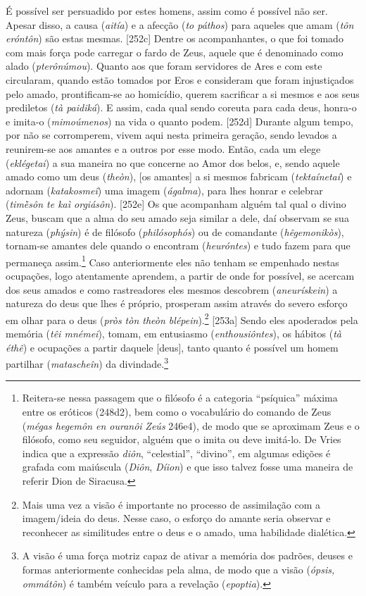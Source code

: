 É possível ser persuadido por estes homens, assim como é possível não
ser. Apesar disso, a causa (\emph{aitía}) e a afecção (\emph{to páthos})
para aqueles que amam (\emph{tôn eróntôn}) são estas mesmas. {[}252c{]}
Dentre os acompanhantes, o que foi tomado com mais força pode carregar o
fardo de Zeus, aquele que é denominado como alado (\emph{pterônúmou}).
Quanto aos que foram servidores de Ares e com este circularam, quando
estão tomados por Eros e consideram que foram injustiçados pelo amado,
prontificam-se ao homicídio, querem sacrificar a si mesmos e aos seus
prediletos (\emph{tà paidiká}). E assim, cada qual sendo coreuta para
cada deus, honra-o e imita-o (\emph{mimoúmenos}) na vida o quanto podem.
{[}252d{]} Durante algum tempo, por não se corromperem, vivem aqui nesta
primeira geração, sendo levados a reunirem-se aos amantes e a outros por
esse modo. Então, cada um elege (\emph{eklégetai}) a sua maneira no que
concerne ao Amor dos belos, e, sendo aquele amado como um deus
(\emph{theòn}), {[}os amantes{]} a si mesmos fabricam
(\emph{tektaínetaí}) e adornam (\emph{katakosmeî}) uma imagem
(\emph{ágalma}), para lhes honrar e celebrar (\emph{timḕsôn te kaì
orgiásôn}). {[}252e{]} Os que acompanham alguém tal qual o divino Zeus,
buscam que a alma do seu amado seja similar a dele, daí observam se sua
natureza (\emph{phýsin}) é de filósofo (\emph{philósophós}) ou de
comandante (\emph{hêgemonikòs}), tornam-se amantes dele quando o
encontram (\emph{heuróntes}) e tudo fazem para que permaneça
assim.\footnote{Reitera-se nessa passagem que o filósofo é a categoria
  ``psíquica'' máxima entre os eróticos (248d2), bem como o vocabulário
  do comando de Zeus (\emph{mégas hegemôn en ouranôi} \emph{Zeús}
  246e4), de modo que se aproximam Zeus e o filósofo, como seu seguidor,
  alguém que o imita ou deve imitá-lo. De Vries indica que a expressão
  \emph{diôn}, ``celestial'', ``divino'', em algumas edições é grafada
  com maiúscula (\emph{Diôn}, \emph{Díion}) e que isso talvez fosse uma
  maneira de referir Dion de Siracusa.} Caso anteriormente eles não
tenham se empenhado nestas ocupações, logo atentamente aprendem, a
partir de onde for possível, se acercam dos seus amados e como
rastreadores eles mesmos descobrem (\emph{aneurískein}) a natureza do
deus que lhes é próprio, prosperam assim através do severo esforço em
olhar para o deus (\emph{pròs tòn theòn blépein}).\footnote{Mais uma vez
  a visão é importante no processo de assimilação com a imagem/ideia do
  deus. Nesse caso, o esforço do amante seria observar e reconhecer as
  similitudes entre o deus e o amado, uma habilidade dialética.}
{[}253a{]} Sendo eles apoderados pela memória (\emph{têi mnémei}),
tomam, em entusiasmo (\emph{enthousiôntes}), os hábitos (\emph{tà éthê})
e ocupações a partir daquele {[}deus{]}, tanto quanto é possível um
homem partilhar (\emph{matascheîn}) da divindade.\footnote{A visão é uma
  força motriz capaz de ativar a memória dos padrões, deuses e formas
  anteriormente conhecidas pela alma, de modo que a visão (\emph{ópsis,
  ommátôn}) é também veículo para a revelação (\emph{epoptia}).}

